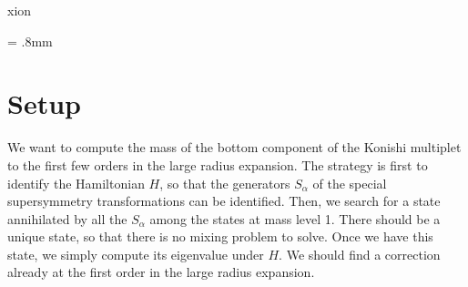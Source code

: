 xion\documentclass[12pt]{article}
\numberwithin{equation}{section}
\begin{document}
\unitlength = .8mm


\eject

\begingroup
\hypersetup{linkcolor=black}

\tableofcontents

\endgroup

\section{Setup}
We want to compute the mass of the bottom component of the Konishi multiplet to the first few orders in the large radius expansion. The strategy is first to identify the Hamiltonian $H$, so that the generators $S_\alpha$ of the special supersymmetry transformations can be identified. Then, we search for a state annihilated by all the $S_\alpha$ among the states at mass level 1. There should be a unique state, so that there is no mixing problem to solve. Once we have this state, we simply compute its eigenvalue under $H$. We should find a correction already at the first order in the large radius expansion.
\end{document}

